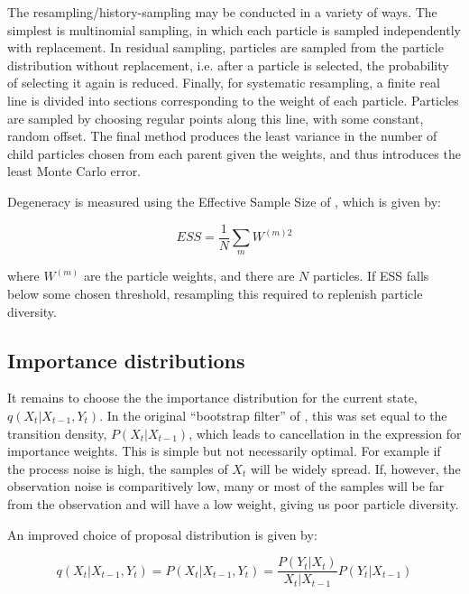 The resampling/history-sampling may be conducted in a variety of ways. The simplest is multinomial sampling, in which each particle is sampled independently with replacement. In residual sampling, particles are sampled from the particle distribution without replacement, i.e. after a particle is selected, the probability of selecting it again is reduced. Finally, for systematic resampling, a finite real line is divided into sections corresponding to the weight of each particle. Particles are sampled by choosing regular points along this line, with some constant, random offset. The final method produces the least variance in the number of child particles chosen from each parent given the weights, and thus introduces the least Monte Carlo error.

Degeneracy is measured using the Effective Sample Size of \cite{Liu1995}, which is given by:

\begin{equation}
ESS = \frac{1}{N} \sum_m W^{(m)2}
\label{eq:ESS}
\end{equation}

where $W^{(m)}$ are the particle weights, and there are $N$ particles. If ESS falls below some chosen threshold, resampling this required to replenish particle diversity.



\subsection{Importance distributions}

It remains to choose the the importance distribution for the current state, $q(X_{t}|X_{t-1}, Y_{t})$. In the original ``bootstrap filter'' of \cite{Gordon1993}, this was set equal to the transition density, $P(X_t|X_{t-1})$, which leads to cancellation in the expression for importance weights. This is simple but not necessarily optimal. For example if the process noise is high, the samples of $X_t$ will be widely spread. If, however, the observation noise is comparitively low, many or most of the samples will be far from the observation and will have a low weight, giving us poor particle diversity.

An improved choice of proposal distribution is given by:

\begin{equation}
q(X_{t}|X_{t-1}, Y_{t}) = P(X_t|X_{t-1}, Y_t) = \frac{P(Y_t|X_t)}{X_t|X_{t-1}}{P(Y_t|X_{t-1})}
\label{eq:OptimalImportanceDist}
\end{equation}

